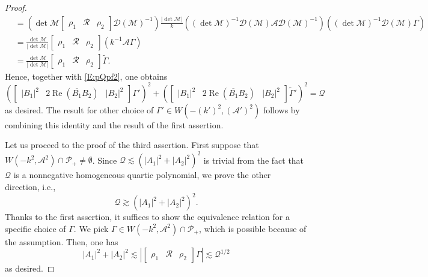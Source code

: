 \documentclass[11pt,a4paper,oneside]{amsart}
\theoremstyle{plain}
\theoremstyle{remark}
\numberwithin{equation}{section}
\renewcommand{\Re}{\operatorname{Re}}
\theoremstyle{definition}
\begin{document}
\begin{proof}
\begin{align*}
	&=(\det \mathscr{M} \begin{bmatrix} \rho_1 & \mathcal{R} & \rho_2
	\end{bmatrix} \mathscr{D}(\mathscr{M})^{-1} ) \tfrac{|\det \mathscr{M}|}{k}( (\det \mathscr{M})^{-1} \mathscr{D}(\mathscr{M})\mathscr{A}\mathscr{D}(\mathscr{M})^{-1})( (\det \mathscr{M} )^{-1}\mathscr{D}(\mathscr{M})\Gamma) \\
	&= \tfrac{\det \mathscr{M}}{|\det \mathscr{M}|} \begin{bmatrix} \rho_1 & \mathcal{R} & \rho_2
	\end{bmatrix}(k^{-1} \mathscr{A}\Gamma)\\
	&= \tfrac{\det \mathscr{M}}{|\det \mathscr{M}|} \begin{bmatrix} \rho_1 & \mathcal{R} & \rho_2
	\end{bmatrix}\widetilde{\Gamma}.
\end{align*}
Hence, together with \eqref{E:pQpf2}, one obtains
\[
	(\begin{bmatrix}|B_1|^2 &2\Re (\overline{B_1}B_2) & |B_2|^2\end{bmatrix}\Gamma')^2+(\begin{bmatrix}|B_1|^2 &2\Re (\overline{B_1}B_2) & |B_2|^2\end{bmatrix} \widetilde{\Gamma}')^2
	=\mathcal{Q}
\]
as desired. The result for other choice of $\Gamma' \in W(-( k')^2,(\mathscr{A}')^2)$ follows by combining this identity and
the result of the first assertion.


Let us proceed to the proof of the third assertion.
First suppose that $W(-k^2,\mathscr{A}^2)\cap \mathcal{P}_+ \neq \emptyset$.
Since $\mathcal{Q} \lesssim (|A_1|^2+|A_2|^2)^2$ is trivial from the fact that $\mathcal{Q}$ is a nonnegative homogeneous quartic polynomial, we prove the other direction, i.e.,
\[
	\mathcal{Q} \gtrsim (|A_1|^2+|A_2|^2)^2.
\]
Thanks to the first assertion, it suffices to show the equivalence relation for a specific choice of $\Gamma$.
We pick $\Gamma \in W(-k^2,\mathscr{A}^2) \cap \mathcal{P}_+$, which is possible because of the assumption.
Then, one has
\[
	|A_1|^2 + |A_2|^2 \lesssim
	|\begin{bmatrix}
	\rho_1 & \mathcal{R} & \rho_2
	\end{bmatrix}\Gamma| \lesssim \mathcal{Q}^{1/2}
\]
as desired.


\end{proof}
\end{document}

